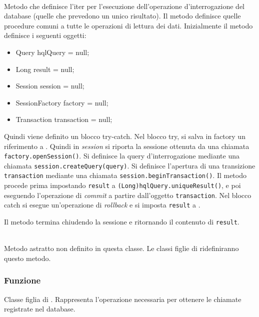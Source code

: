 \begin{description}
	\item{}\\
	Metodo che definisce l'iter per l'esecuzione dell'operazione d'interrogazione del database (quelle che prevedono un unico risultato). Il metodo definisce quelle procedure comuni a tutte le operazioni di lettura dei dati. Inizialmente il metodo definisce i seguenti oggetti:
	\begin{itemize}
		\item Query hqlQuery = null;
		\item Long result = null;
		\item Session session = null;
		\item SessionFactory factory = null;
		\item Transaction transaction = null;
	\end{itemize}
	
Quindi viene definito un blocco try-catch. Nel blocco try, si salva in factory un riferimento a . Quindi in \textit{session} si riporta la sessione ottenuta da una chiamata \verb|factory.openSession()|. Si definisce la query d'interrogazione mediante una chiamata \verb|session.createQuery(query)|. Si definisce l'apertura di una transizione \texttt{transaction} mediante una chiamata \verb|session.beginTransaction()|. Il metodo procede prima impostando \texttt{result} a \verb|(Long)hqlQuery.uniqueResult()|, e poi eseguendo l'operazione di \textit{commit} a partire dall'oggetto \texttt{transaction}. Nel blocco catch si esegue un'operazione di \textit{rollback} e si imposta \texttt{result} a .

Il metodo termina chiudendo la sessione e ritornando il contenuto di \texttt{result}.

	\item{}\\
	Metodo astratto non definito in questa classe. Le classi figlie di  ridefiniranno questo metodo.

\end{description}


\subsubsection*{Funzione}
Classe figlia di . Rappresenta l'operazione necessaria per ottenere le chiamate registrate nel database.

